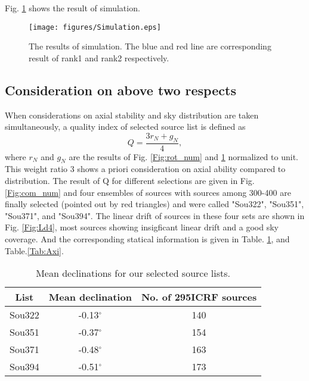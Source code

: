 \documentclass{aa}
\begin{document}
Fig. \ref{Fig:sim} shows the result of simulation.
	\begin{figure}
   \centering
   \texttt{[image: figures/Simulation.eps]}
      \caption{
      The results of simulation. The blue and red line are corresponding result of rank1 and rank2 respectively.
              }
         \label{Fig:sim}
   \end{figure}

\subsection{Consideration on above two respects}
When considerations on axial stability and sky distribution are taken simultaneously, a quality index of selected source list is defined as
\begin{equation}
Q = \frac{3r_N+g_N}{4},
\end{equation}
where $r_N$ and $g_N$ are the results of Fig. \ref{Fig:rot_num} and \ref{Fig:sim} normalized to unit. This weight ratio 3 shows a priori consideration on axial ability compared to distribution. The result of Q for different selections are given in Fig. \ref{Fig:com_num} and four ensembles of sources with sources among 300-400 are finally selected (pointed out by red triangles) and were called "Sou322", "Sou351", "Sou371", and "Sou394". The linear drift of sources in these four sets are shown in Fig. \ref{Fig:Ld4}, most sources showing insigficant linear drift and a good sky coverage. And the corresponding statical information is given in Table.  \ref{Tab:Mean_Dec}, and Table.\ref{Tab:Axi}.

	\begin{table}
	\caption{Mean declinations for our selected source lists.}
	\label{Tab:Mean_Dec}
	\centering
	\begin{tabular}{ccc}
	\hline\hline
List & Mean declination  &No. of 295ICRF sources         \\
\hline
Sou322& -0.13$^{\circ}$ &140                 \\
Sou351& -0.37$^{\circ}$ &154                 \\
Sou371& -0.48$^{\circ}$ &163                 \\
Sou394& -0.51$^{\circ}$ &173                 \\
\hline
	\end{tabular}
	\end{table}
	
\end{document}
